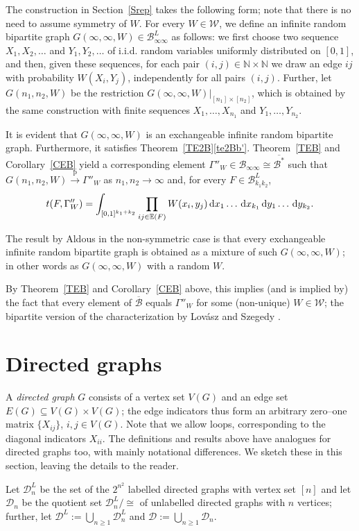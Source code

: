 \documentclass[11pt,reqno,tbtags]{amsart}
\numberwithin{equation}{section}
\theoremstyle{definition}
\theoremstyle{remark}
\newcommand{\refT}[1]{Theorem~\ref{#1}}
\newcommand{\refC}[1]{Corollary~\ref{#1}}
\newcommand{\refS}[1]{Section~\ref{#1}}
\newcommand\set[1]{\ensuremath{\{#1\}}}
\newcommand\bigpar[1]{\bigl(#1\bigr)}
\newcommand\iid{i.i.d.\spacefactor=1000}
\newcommand{\tend}{\longrightarrow}
\newcommand\pto{\overset{\mathrm{p}}{\tend}}
\newcommand\bbN{\mathbb N}
\newcommand\E{\operatorname{\mathbb E{}}}
\renewcommand\P{\operatorname{\mathbb P{}}}
\newcommand\cB{\mathcal B}
\newcommand\cD{\mathcal D}
\newcommand\cW{\mathcal W}
\renewcommand{\=}{:=}
\newcommand\oi{[0,1]}
\newcommand\dd{\,\textup{d}}
\newcommand{\Lovaszetal}{Lov\'asz and Szegedy}
\newcommand{\restnn}{|_{[n_1]\times[n_2]}}
\newcommand{\exch}{exchangeable}
\newcommand{\BUxx}[2]{\cB_{#1#2}}
\newcommand{\BLxx}[2]{\cB^L_{#1#2}}
\newcommand{\BLkk}{\BLxx{k_1}{k_2}}
\newcommand{\cbx}{\cB^*}
\newcommand{\cbxq}{\overline{\cbx}}
\newcommand{\cbq}{\overline{\cB}}
\newcommand{\cboo}{\BUxx{\infty}{\infty}}
\newcommand{\cbloo}{\BLxx{\infty}{\infty}}
\newcommand{\DU}{\cD}
\newcommand{\DUx}[1]{\cD_{#1}}
\newcommand{\DUn}{\DUx{n}}
\newcommand{\DL}{\cD^L}
\newcommand{\DLx}[1]{\cD^L_{#1}}
\newcommand{\DLn}{\DLx{n}}
\newcommand{\cw}{\cW}
\newcommand{\gwx}[1]{G(#1,W)}
\newcommand{\gwxx}[2]{G(#1,#2,W)}
\newcommand{\gwoooo}{\gwxx{\infty}{\infty}}
\newcommand{\gwnn}{\gwxx{n_1}{n_2}}
\newcommand{\uww}{\Gamma''_W}
\begin{document}
The construction in \refS{Srep} takes the following form; note that
there is no need to assume symmetry of $W$.
For every $W\in\cw$, we define an infinite random bipartite graph
$\gwoooo\in\cbloo$ as follows: we
first choose two sequence $X_1,X_2,\dots$  and $Y_1,Y_2,\dots$ 
of \iid{} random variables
uniformly distributed on $\oi$, and then, given these sequences,
for each pair $(i,j)\in \bbN\times\bbN$ we draw an edge 
$ij$ with probability $W(X_i,Y_j)$, %
independently for
all pairs $(i,j)$.
Further, let $\gwnn$ be the restriction $\gwoooo\restnn$, which is
obtained by the same construction with finite sequences
$X_1,\dots,X_{n_1}$ and $Y_1,\dots,Y_{n_2}$.

It is evident that $\gwoooo$ is an \exch{} infinite random bipartite
graph. Furthermore, it satisfies \refT{TE2B}\ref{te2Bb'}.
\refT{TEB} and \refC{CEB} yield a corresponding element
$\uww\in\cboo\cong\cbxq$ such that $\gwnn\pto\uww$ as
$n_1,n_2\to\infty$ and, for every $F\in\BLkk$, 
\begin{equation}\label{tuww}
  t(F,\uww)
=
\int_{\oi^{k_1+k_2}} \prod_{ij\in\E(F)} W(x_i,y_j) 
  \dd x_1\dots \dd x_{k_1}  \dd y_1\dots \dd y_{k_2}.
\end{equation}

The result by Aldous \cite{Aldous} in the non-symmetric case
is that every \exch{} infinite random bipartite graph is obtained as a
mixture of such $\gwoooo$; in 
other words as $\gwoooo$ with a random $W$. 

By \refT{TEB} and \refC{CEB} above, this implies (and is implied by)
the fact that every element of $\cbq$ equals $\uww$ for some
(non-unique) $W\in\cw$;
the bipartite version of the characterization by \Lovaszetal{}
\cite{LSz}.


\section{Directed graphs}\label{Sdir}


A \emph{directed graph} $G$ consists of a vertex set
$V(G)$ and an edge set $E(G)\subseteq V(G)\times V(G)$; 
the edge indicators thus form an arbitrary zero--one matrix
\set{X_{ij}}, $i,j\in V(G)$. Note that we allow loops, corresponding
to the diagonal indicators $X_{ii}$.
The definitions and results above have analogues for directed
graphs too, with mainly notational differences. We sketch these in
this section, leaving the details to the reader. 


Let $\DLn$ be the set of the $2^{n^2}$ labelled directed graphs
with vertex set $[n]$ and let $\DUn$ be the quotient
set $\DLn/\cong$ of unlabelled directed graphs with $n$
vertices; further, let
$\DL\=\bigcup_{n\ge1}\DLn$ and $\DU\=\bigcup_{n\ge1}\DUn$.
\end{document}
